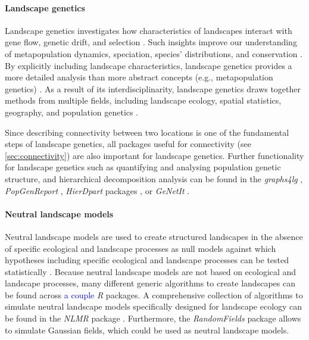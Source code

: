\documentclass[smallextended]{svjour3}       %
\begin{document}
\hypertarget{sec:landscape_genetics}{%
\paragraph{Landscape genetics}\label{sec:landscape_genetics}}

Landscape genetics investigates how characteristics of landscapes interact with gene flow, genetic drift, and selection \cite{Manel2003}.
Such insights improve our understanding of metapopulation dynamics, speciation, species' distributions, and conservation \cite{Storfer2007}.
By explicitly including landscape characteristics, landscape genetics provides a more detailed analysis than more abstract concepts (e.g., metapopulation genetics) \cite{Holderegger2006}.
As a result of its interdisciplinarity, landscape genetics draws together methods from multiple fields, including landscape ecology, spatial statistics, geography, and population genetics \cite{Storfer2007}.

Since describing connectivity between two locations is one of the fundamental steps of landscape genetics, all packages useful for connectivity (see \ref{sec:connectivity}) are also important for landscape genetics.
Further functionality for landscape genetics such as quantifying and analysing population genetic structure, and hierarchical decomposition analysis can be found in the \textit{graphs4lg} \cite{Savary2020}, \textit{PopGenReport} \cite{Adamack2014,Gruber2015}, \textit{HierDpart} packages \cite{Qin2019}, or \textit{GeNetIt} \cite{Murphy2010}.

\hypertarget{sec:NLM}{%
\paragraph{Neutral landscape models}\label{sec:NLM}}

Neutral landscape models are used to create structured landscapes in the absence of specific ecological and landscape processes as null models against which hypotheses including specific ecological and landscape processes can be tested statistically \cite{Gardner1987,With1997}.
Because neutral landscape models are not based on ecological and landscape processes, many different generic algorithms to create landscapes can be found across \textcolor{blue}{a couple} \textit{R} packages.
A comprehensive collection of algorithms to simulate neutral landscape models specifically designed for landscape ecology can be found in the \textit{NLMR} package \cite{Sciaini2018}.
Furthermore, the \textit{RandomFields} package \cite{Schlather2015} allows to simulate Gaussian fields, which could be used as neutral landscape models.
\end{document}
